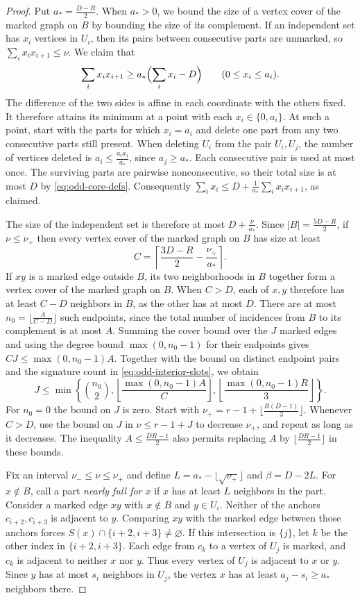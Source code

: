 \documentclass[preprint,11pt,numbers]{elsarticle-arxiv}
\numberwithin{equation}{section}
\theoremstyle{definition}
\begin{document}
\begin{proof}
Put $a_*=\frac{D-R}{2}$. When $a_*>0$, we bound the size
of a vertex cover of the marked graph on $B$ by bounding the
size of its complement. If an independent set has $x_i$ vertices
in $U_i$, then its pairs between consecutive parts are unmarked,
so $\sum_i x_ix_{i+1}\leq \nu$. We claim that
\[
 \sum_i x_ix_{i+1}\geq a_*\Bigl(\sum_i x_i-D\Bigr)
 \qquad (0\leq x_i\leq a_i).
\]
The difference of the two sides is affine in each coordinate
with the others fixed. It therefore attains its minimum at a
point with each $x_i\in\{0,a_i\}$. At such a point, start with
the parts for which $x_i=a_i$ and delete one part from any two
consecutive parts still present. When deleting $U_i$ from the
pair $U_i,U_j$, the number of vertices deleted is
$a_i\leq\frac{a_ia_j}{a_*}$, since $a_j\geq a_*$. Each consecutive
pair is used at most once. The surviving parts are pairwise
nonconsecutive, so their total size is at most $D$ by
\eqref{eq:odd-core-defs}. Consequently
$\sum_i x_i\leq D+\frac{1}{a_*}\sum_i x_ix_{i+1}$,
as claimed.

The size of the independent set is therefore at most
$D+\frac{\nu}{a_*}$. Since $|B|=\frac{5D-R}{2}$, if
$\nu\leq\nu_+$ then every vertex cover of the marked graph
on $B$ has size at least
\[
 C=\left\lceil \frac{3D-R}{2}-\frac{\nu_+}{a_*}\right\rceil.
\]
If $xy$ is a marked edge outside $B$, its two neighborhoods
in $B$ together form a vertex cover of the marked graph on $B$.
When $C>D$, each of $x,y$ therefore has at least $C-D$ neighbors
in $B$, as the other has at most $D$. There are at most
$n_0=\bigl\lfloor\frac{A}{C-D}\bigr\rfloor$ such endpoints, since
the total number of incidences from $B$ to its complement is at
most $A$. Summing the cover bound over the $J$ marked edges and
using the degree bound $\max(0,n_0-1)$ for their endpoints gives
$CJ\leq\max(0,n_0-1)A$. Together with the bound on distinct
endpoint pairs and the signature count in \eqref{eq:odd-interior-slots},
we obtain
\[
 J\leq \min\left\{\binom{n_0}{2},
       \left\lfloor\frac{\max(0,n_0-1)A}{C}\right\rfloor,
       \left\lfloor\frac{\max(0,n_0-1)R}{3}\right\rfloor\right\}.
\]
For $n_0=0$ the bound on $J$ is zero. Start with
$\nu_+=r-1+\lfloor\frac{R(D-1)}{3}\rfloor$. Whenever $C>D$,
use the bound on $J$ in $\nu\leq r-1+J$ to decrease $\nu_+$,
and repeat as long as it decreases. The inequality
$A\leq\frac{DR-1}{2}$ also permits replacing $A$ by
$\lfloor\frac{DR-1}{2}\rfloor$ in these bounds.

Fix an interval $\nu_-\leq\nu\leq\nu_+$ and define
$L=a_*-\lfloor\sqrt{\nu_+}\rfloor$ and $\beta=D-2L$.
For $x\notin B$, call a part \emph{nearly full for $x$} if
$x$ has at least $L$ neighbors in the part. Consider a marked
edge $xy$ with $x\notin B$ and $y\in U_i$. Neither of the
anchors $c_{i+2},c_{i+3}$ is adjacent to $y$. Comparing $xy$
with the marked edge between those anchors forces
$S(x)\cap\{i+2,i+3\}\ne\varnothing$. If this intersection is
$\{j\}$, let $k$ be the other index in $\{i+2,i+3\}$. Each
edge from $c_k$ to a vertex of $U_j$ is marked, and $c_k$ is
adjacent to neither $x$ nor $y$. Thus every vertex of $U_j$
is adjacent to $x$ or $y$. Since $y$ has at most $s_i$
neighbors in $U_j$, the vertex $x$ has at least
$a_j-s_i\geq a_*$ neighbors there.


\end{proof}
\end{document}
